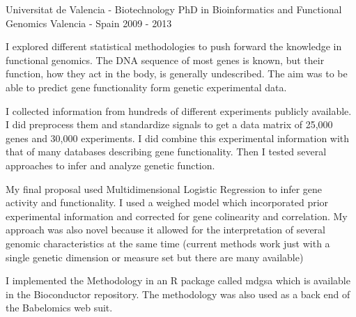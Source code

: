 


\begin{cventries}



\cventry
{Universitat de Valencia - Biotechnology} %
{PhD in Bioinformatics and Functional Genomics} %
{Valencia - Spain} %
{2009 - 2013} %
{ %
\begin{cvitems}
\item {
I explored different statistical methodologies to push forward the knowledge in functional genomics.
The DNA sequence of most genes is known, but their function, how they act in the body, is generally undescribed. 
The aim was to be able to predict gene functionality form genetic experimental data.
}
\item {
I collected information from hundreds of different experiments publicly available.
I did preprocess them and standardize signals to get a data matrix of 25,000 genes and 30,000 experiments.
I did combine this experimental information with that of many databases describing gene functionality.
Then I tested several approaches to infer and analyze genetic function.
}
\item {
My final proposal used Multidimensional Logistic Regression to infer gene activity and functionality.
I used a weighed model which incorporated prior experimental information and corrected for gene colinearity and correlation.
My approach was also novel because it allowed for the interpretation of several genomic characteristics at the same time
(current methods work just with a single genetic dimension or measure set but there are many available)
}
\item {
I implemented the Methodology in an R package called mdgsa which is available in the Bioconductor repository.
The methodology was also used as a back end of the Babelomics web suit.
}
\end{cvitems}
}


\end{cventries}
